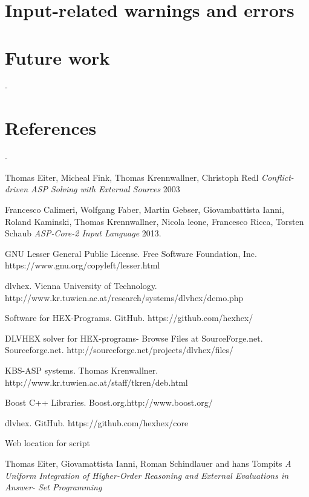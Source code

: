 \documentclass[a4paper, titlepage]{article}
\begin{document}
\section{Input-related warnings and errors}
\label{sec:inputRelatedWarnings}

\section{Future work}
\label{sec:future}


 \newpage
-\section{References}
-\begin{thebibliography}{1}
 Thomas Eiter, Micheal Fink, Thomas 
Krennwallner, Christoph Redl {\em Conflict-driven ASP 
Solving with External Sources} 2003   
  
 Francesco Calimeri, Wolfgang Faber, Martin 
Gebser, Giovambattista Ianni, Roland Kaminski, Thomas 
Krennwallner, Nicola leone, Francesco Ricca, Torsten Schaub 
{\em ASP-Core-2 Input Language} 2013.

 GNU Lesser General Public License. Free 
Software Foundation, Inc. 
https://www.gnu.org/copyleft/lesser.html 

dlvhex. Vienna University of 
Technology. 
http://www.kr.tuwien.ac.at/research/systems/dlvhex/demo.php 

Software for HEX-Programs. GitHub. 
https://github.com/hexhex/ 

DLVHEX solver for HEX-programs-  
Browse Files at SourceForge.net. Sourceforge.net. 
http://sourceforge.net/projects/dlvhex/files/

KBS-ASP systems. Thomas Krenwallner. 
http://www.kr.tuwien.ac.at/staff/tkren/deb.html

Boost C++ Libraries. 
Boost.org.http://www.boost.org/

% 
%
 
dlvhex. GitHub. 
https://github.com/hexhex/core

Web location for script

Thomas Eiter, Giovamattista Ianni, Roman 
Schindlauer and hans Tompits {\em A Uniform Integration of 
Higher-Order Reasoning and External Evaluations in Answer-
Set Programming} 



\end{thebibliography}
\end{document}
